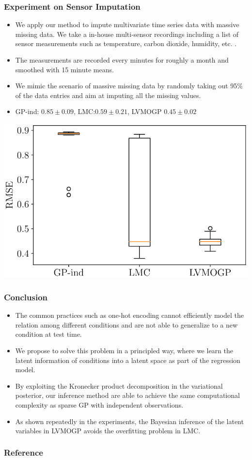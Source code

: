 \documentclass[aspectratio=169]{beamer}
\begin{document}
       \begin{frame}
    \frametitle{Experiment on Sensor Imputation}
    \begin{itemize}
    \item We apply our method to impute multivariate time series data with massive missing data. We take a in-house multi-sensor recordings including a list of sensor measurements such as temperature, carbon dioxide, humidity, etc. \citep{ZamoraEtAl2014}.
    \item The measurements are recorded every minutes for roughly a month and smoothed with 15 minute means.
    \item We mimic the scenario of massive missing data by randomly taking out 95\% of the data entries and aim at imputing all the missing values.
    \item GP-ind: $0.85\pm0.09$, LMC:$0.59\pm0.21$, LVMOGP $0.45\pm0.02$
  \end{itemize}
      \begin{center}
\includegraphics[width=.3\linewidth]{sml2010_results}
     \end{center}
  \end{frame}

       \begin{frame}
    \frametitle{Conclusion}
    \begin{itemize}
    \item The common practices such as one-hot encoding cannot efficiently model the relation among different conditions and are not able to generalize to a new condition at test time. 
    \item We propose to solve this problem in a principled way, where we learn the latent information of conditions into a latent space as part of the regression model. 
    \item By exploiting the Kronecker product decomposition in the variational posterior, our inference method are able to achieve the same computational complexity as sparse GP with independent observations. 
    \item As shown repeatedly in the experiments, the Bayesian inference of the latent variables in LVMOGP avoids the overfitting problem in LMC.  \end{itemize}
  \end{frame}
 
 \begin{frame}
  \frametitle{Reference}
  \footnotesize


\end{frame}
\end{document}
